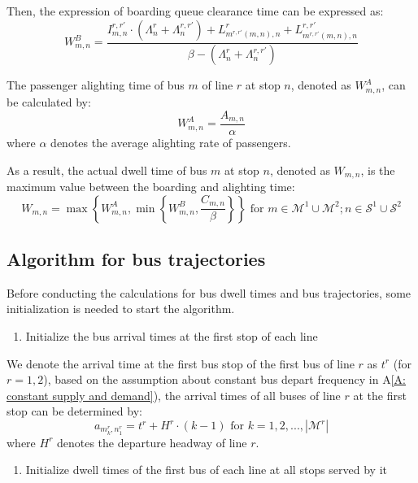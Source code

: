 \documentclass[smallextended]{svjour3}       %
\begin{document}
\begin{Abstract}
Then, the expression of boarding queue clearance time can be expressed as:
\begin{equation}
    \label{equ:WB}
    W_{m,n}^{B} = \frac{I_{m,n}^{r,r'}\cdot \left(\Lambda_{n}^{r}+\Lambda_{n}^{r,r'}\right)
    +L_{m^{r,r'}(m,n),n}^{r}+L_{m^{r,r'}(m,n),n}^{r,r'}}
    {\beta-\left(\Lambda_{n}^{r}+\Lambda_{n}^{r,r'}\right)}
\end{equation}

The passenger alighting time of bus $m$ of line $r$ at stop $n$, denoted as $W_{m,n}^{A}$, can be calculated by:
\begin{equation}
    \label{equ:WA}
    W_{m,n}^{A} = \frac{A_{m,n}}{\alpha} %
\end{equation}
where $\alpha$ denotes the average alighting rate of passengers. 

As a result, the actual dwell time of bus $m$ at stop $n$, denoted as $W_{m,n}$,
is the maximum value between the boarding and alighting time:
\begin{equation}
    \label{equ:W}
    W_{m,n} = \max \left\{W_{m,n}^{A},\min \left\{W_{m,n}^{B},\frac{C_{m,n}}{\beta}\right\}\right\}
    \text{ for } m \in \mathcal{M}^{1}\cup \mathcal{M}^{2};n\in \mathcal{S}^{1}\cup\mathcal{S}^{2}
\end{equation}

\subsection{Algorithm for bus trajectories}
Before conducting the calculations for bus dwell times and bus trajectories,
some initialization is needed to start the algorithm.

\begin{enumerate}[1)]
    \item Initialize the bus arrival times at the first stop of each line
\end{enumerate}

We denote the arrival time at the first bus stop of the first bus of line $r$ as $t^{r}$ (for $r=1,2$), 
based on the assumption about constant bus depart frequency in A\ref{A: constant supply and demand}), 
the arrival times of all buses of line $r$ at the first stop can be determined by:
\begin{equation}
    a_{m^{r}_{k},n^{r}_{1}} = t^{r} + H^{r} \cdot \left(k-1\right) \text{ for } k=1,2,...,\left| \mathcal{M}^{r} \right|
\end{equation}
where $H^{r}$ denotes the departure headway of line $r$. 
\begin{enumerate}[2)]
    \item Initialize dwell times of the first bus of each line at all stops served by it
\end{enumerate}


\end{Abstract}
\end{document}
